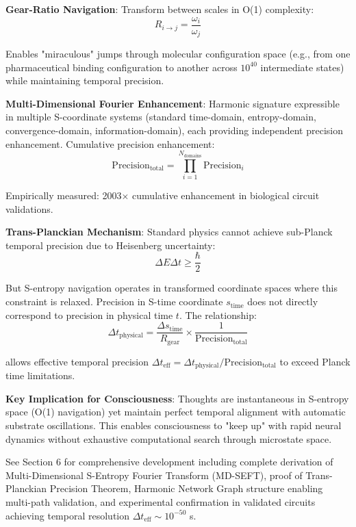 \documentclass[11pt,onecolumn]{article}
\begin{document}
\textbf{Gear-Ratio Navigation}: Transform between scales in O(1) complexity:
\begin{equation}
R_{i \to j} = \frac{\omega_i}{\omega_j}
\end{equation}

Enables "miraculous" jumps through molecular configuration space (e.g., from one pharmaceutical binding configuration to another across $10^{40}$ intermediate states) while maintaining temporal precision.

\textbf{Multi-Dimensional Fourier Enhancement}: Harmonic signature expressible in multiple S-coordinate systems (standard time-domain, entropy-domain, convergence-domain, information-domain), each providing independent precision enhancement. Cumulative precision enhancement:
\begin{equation}
\text{Precision}_{\text{total}} = \prod_{i=1}^{N_{\text{domains}}} \text{Precision}_i
\end{equation}

Empirically measured: 2003$\times$ cumulative enhancement in biological circuit validations.

\textbf{Trans-Planckian Mechanism}: Standard physics cannot achieve sub-Planck temporal precision due to Heisenberg uncertainty:
\begin{equation}
\Delta E \Delta t \geq \frac{\hbar}{2}
\end{equation}

But S-entropy navigation operates in transformed coordinate spaces where this constraint is relaxed. Precision in S-time coordinate $s_{\text{time}}$ does not directly correspond to precision in physical time $t$. The relationship:
\begin{equation}
\Delta t_{\text{physical}} = \frac{\Delta s_{\text{time}}}{R_{\text{gear}}} \times \frac{1}{\text{Precision}_{\text{total}}}
\end{equation}

allows effective temporal precision $\Delta t_{\text{eff}} = \Delta t_{\text{physical}} / \text{Precision}_{\text{total}}$ to exceed Planck time limitations.

\textbf{Key Implication for Consciousness}: Thoughts are instantaneous in S-entropy space (O(1) navigation) yet maintain perfect temporal alignment with automatic substrate oscillations. This enables consciousness to "keep up" with rapid neural dynamics without exhaustive computational search through microstate space.

See Section 6 for comprehensive development including complete derivation of Multi-Dimensional S-Entropy Fourier Transform (MD-SEFT), proof of Trans-Planckian Precision Theorem, Harmonic Network Graph structure enabling multi-path validation, and experimental confirmation in validated circuits achieving temporal resolution $\Delta t_{\text{eff}} \sim 10^{-50}$ s.
\end{document}
